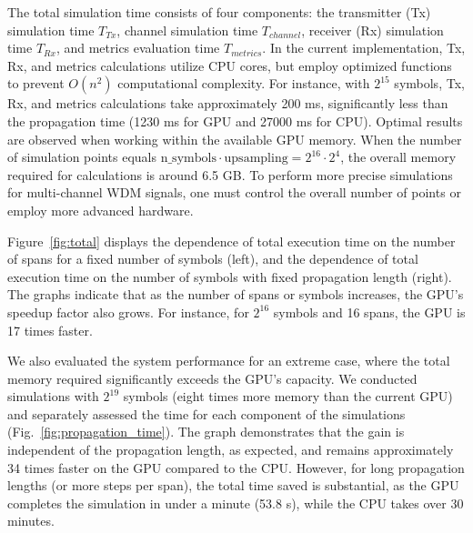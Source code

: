 The total simulation time consists of four components: the transmitter (Tx) simulation time $T_{Tx}$, channel simulation time $T_{channel}$, receiver (Rx) simulation time $T_{Rx}$, and metrics evaluation time $T_{metrics}$. In the current implementation, Tx, Rx, and metrics calculations utilize CPU cores, but employ optimized functions to prevent $O(n^2)$ computational complexity. For instance, with $2^{15}$ symbols, Tx, Rx, and metrics calculations take approximately 200 ms, significantly less than the propagation time (1230 ms for GPU and 27000 ms for CPU). Optimal results are observed when working within the available GPU memory. When the number of simulation points equals $\mathrm{n\_symbols} \cdot \mathrm{upsampling} = 2^{16} \cdot 2^{4}$, the overall memory required for calculations is around 6.5 GB. To perform more precise simulations for multi-channel WDM signals, one must control the overall number of points or employ more advanced hardware.

Figure~\ref{fig:total} displays the dependence of total execution time on the number of spans for a fixed number of symbols (left), and the dependence of total execution time on the number of symbols with fixed propagation length (right). The graphs indicate that as the number of spans or symbols increases, the GPU's speedup factor also grows. For instance, for $2^{16}$ symbols and 16 spans, the GPU is 17 times faster.

We also evaluated the system performance for an extreme case, where the total memory required significantly exceeds the GPU's capacity. We conducted simulations with $2^{19}$ symbols (eight times more memory than the current GPU) and separately assessed the time for each component of the simulations (Fig.~\ref{fig:propagation_time}). The graph demonstrates that the gain is independent of the propagation length, as expected, and remains approximately 34 times faster on the GPU compared to the CPU. However, for long propagation lengths (or more steps per span), the total time saved is substantial, as the GPU completes the simulation in under a minute (53.8 s), while the CPU takes over 30 minutes.

